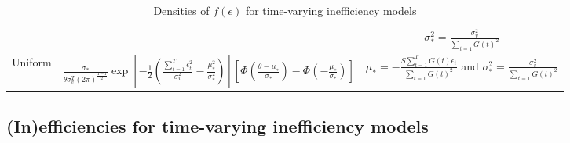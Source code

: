 \documentclass[nojss]{jss}
\begin{document}
\begin{appendix}
\begin{table}[h]
\begin{adjustbox}{max width=0.9\textwidth}
\begin{tabular}{@{}ccc@{}}
& & $\sigma_*^2 = \frac{\sigma_v^2}{\sum_{t=1}G(t)^2}$ \\
Uniform & $\frac{\sigma_*}{\theta\sigma_v^T\left(2\pi\right)^{\frac{T-1}{2}}}\exp{\left[-\frac{1}{2}\left(\frac{\sum_{t=1}^T\epsilon_t^2}{\sigma_v^2}-\frac{\mu_*^2}{\sigma_*^2}\right)\right]}\left[\Phi\left(\frac{\theta-\mu_*}{\sigma_*}\right)-\Phi\left(-\frac{\mu_*}{\sigma_*}\right)\right]$ & 
$\mu_* = -\frac{S\sum_{t=1}^TG(t)\epsilon_t}{\sum_{t=1}G(t)^2}$ and $\sigma_*^2 = \frac{\sigma_v^2}{\sum_{t=1}G(t)^2}$\\
\bottomrule
\end{tabular}
\end{adjustbox}
\caption{Densities of $f(\epsilon)$ for time-varying inefficiency models}
\label{table:mlgzit}
\end{table}

\newpage

\subsection{(In)efficiencies for time-varying inefficiency models}


\end{appendix}
\end{document}
